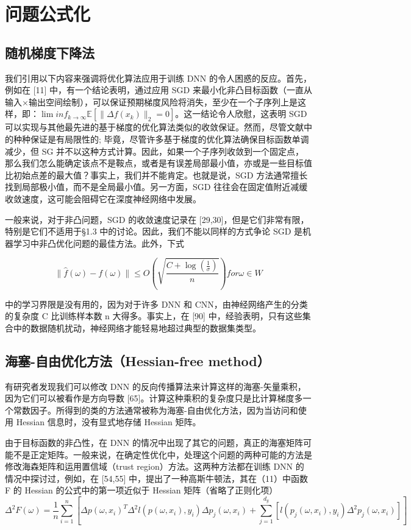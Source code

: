 \documentclass{book}
\begin{document}
\section{问题公式化}

\subsection{随机梯度下降法}

我们引用以下内容来强调将优化算法应用于训练 DNN 的令人困惑的反应。首先，例如在 [11] 中，有一个结论表明，通过应用 SGD 来最小化非凸目标函数（一直从输入×输出空间绘制），可以保证预期梯度风险将消失，至少在一个子序列上是这样，即：$\lim inf_{k\rightarrow\infty}\mathbb{E}[\|\Delta f(x_k)\|_2=0]$。这一结论令人欣慰，这表明 SGD 可以实现与其他最先进的基于梯度的优化算法类似的收敛保证。然而，尽管文献中的种种保证是有局限性的; 毕竟，尽管许多基于梯度的优化算法确保目标函数单调减少，但 SG 并不以这种方式计算。因此，如果一个子序列收敛到一个固定点，那么我们怎么能确定该点不是鞍点，或者是有误差局部最小值，亦或是一些目标值比初始点差的最大值？事实上，我们并不能肯定。也就是说，SGD 方法通常擅长找到局部极小值，而不是全局最小值。另一方面，SGD 往往会在固定值附近减缓收敛速度，这可能会阻碍它在深度神经网络中发展。

一般来说，对于非凸问题，SGD 的收敛速度记录在 [29,30]，但是它们非常有限，特别是它们不适用于§1.3 中的讨论。因此，我们不能以同样的方式争论 SGD 是机器学习中非凸优化问题的最佳方法。此外，下式

\begin{equation}\label{eq:optimizer11}
	\|\hat{f}(\omega)-f(\omega)\|\leq O(\sqrt{\frac{C+\log(\frac{1}{\sigma})}{n}}) for \omega\in W
\end{equation}

中的学习界限是没有用的，因为对于许多 DNN 和 CNN，由神经网络产生的分类的复杂度 C 比训练样本数 n 大得多。事实上，在 [90] 中，经验表明，只有这些集合中的数据随机扰动，神经网络才能轻易地超过典型的数据集类型。

\subsection{海塞-自由优化方法（Hessian-free method）}

有研究者发现我们可以修改 DNN 的反向传播算法来计算这样的海塞-矢量乘积，因为它们可以被看作是方向导数 [65]。计算这种乘积的复杂度只是比计算梯度多一个常数因子。所得到的类的方法通常被称为海塞-自由优化方法，因为当访问和使用 Hessian 信息时，没有显式地存储 Hessian 矩阵。

由于目标函数的非凸性，在 DNN 的情况中出现了其它的问题，真正的海塞矩阵可能不是正定矩阵。一般来说，在确定性优化中，处理这个问题的两种可能的方法是修改海森矩阵和运用置信域（trust region）方法。这两种方法都在训练 DNN 的情况中探讨过，例如，在 [54,55] 中，提出了一种高斯牛顿法，其在（11）中函数 F 的 Hessian 的公式中的第一项近似于 Hessian 矩阵（省略了正则化项）
\begin{equation}\label{eq:optimizer12}
	\Delta^2F(\omega)=\frac{1}{n}\sum_{i=1}^n[\Delta p(\omega,x_i)^T\Delta^2l(p(\omega,x_i),y_i)\Delta p_j(\omega,x_i)+\sum_{j=1}^{d_y}[l(p_j(\omega,x_i),y_i)\Delta^2p_j(\omega,x_i)]]
\end{equation}
\end{document}
